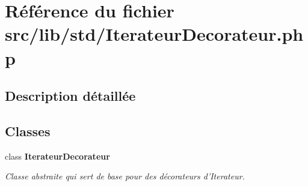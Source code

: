 \section{Référence du fichier src/lib/std/IterateurDecorateur.php}
\label{_iterateur_decorateur_8php}


\subsection{Description détaillée}


\subsection*{Classes}
\begin{CompactItemize}
\item 
class {\bf IterateurDecorateur}
\begin{CompactList}\small\item\em Classe abstraite qui sert de base pour des décorateurs d'Iterateur. \item\end{CompactList}\end{CompactItemize}
